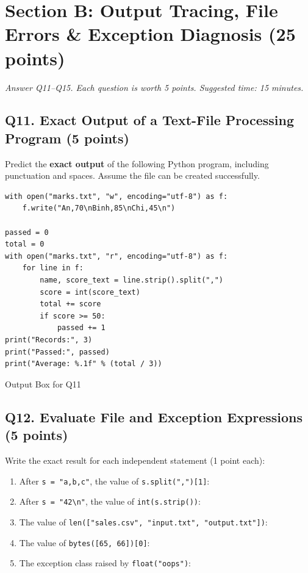 \documentclass[11pt,a4paper]{article}
\begin{document}
\section*{Section B: Output Tracing, File Errors \& Exception Diagnosis \hfill \normalsize\normalfont(25 points)}
\textit{Answer Q11--Q15. Each question is worth 5 points. Suggested time: 15 minutes.}
\subsection*{Q11. Exact Output of a Text-File Processing Program (5 points)}
Predict the \textbf{exact output} of the following Python program, including punctuation and spaces. Assume the file can be created successfully.
\begin{lstlisting}
with open("marks.txt", "w", encoding="utf-8") as f:
    f.write("An,70\nBinh,85\nChi,45\n")

passed = 0
total = 0
with open("marks.txt", "r", encoding="utf-8") as f:
    for line in f:
        name, score_text = line.strip().split(",")
        score = int(score_text)
        total += score
        if score >= 50:
            passed += 1
print("Records:", 3)
print("Passed:", passed)
print("Average: %.1f" % (total / 3))
\end{lstlisting}
\begin{answerbox}[height=3.0cm]{Output Box for Q11}\end{answerbox}
\newpage
\subsection*{Q12. Evaluate File and Exception Expressions (5 points)}
Write the exact result for each independent statement (1 point each):
\begin{enumerate}[label=\alph*),leftmargin=2em,itemsep=2pt]
\item After \texttt{s = "a,b,c"}, the value of \texttt{s.split(",")[1]}: \hrulefill
\item After \lstinline|s = "42\n"|, the value of \texttt{int(s.strip())}: \hrulefill
\item The value of \texttt{len(["sales.csv", "input.txt", "output.txt"])}: \hrulefill
\item The value of \texttt{bytes([65, 66])[0]}: \hrulefill
\item The exception class raised by \texttt{float("oops")}: \hrulefill
\end{enumerate}
\end{document}
